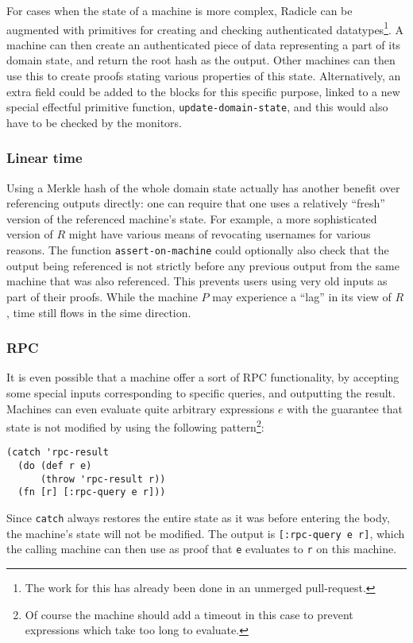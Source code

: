 \documentclass[a4paper, oneside, 10pt]{amsart}
\begin{document}
For cases when the state of a machine is more complex, Radicle can be augmented
with primitives for creating and checking authenticated datatypes\footnote{The
  work for this has already been done in an unmerged pull-request.}. A machine
can then create an authenticated piece of data representing a part of its domain
state, and return the root hash as the output. Other machines can then use this
to create proofs stating various properties of this state. Alternatively, an
extra field could be added to the blocks for this specific purpose, linked to a
new special effectful primitive function, \texttt{update-domain-state}, and this
would also have to be checked by the monitors.

\subsubsection{Linear time}

Using a Merkle hash of the whole domain state actually has another benefit over
referencing outputs directly: one can require that one uses a relatively
``fresh'' version of the referenced machine's state. For example, a more
sophisticated version of $R$ might have various means of revocating usernames
for various reasons. The function \texttt{assert-on-machine} could optionally
also check that the output being referenced is not strictly before any previous
output from the same machine that was also referenced. This prevents users using
very old inputs as part of their proofs. While the machine $P$ may experience a
``lag'' in its view of $R$, time still flows in the sime direction.

\subsubsection{RPC}

It is even possible that a machine offer a sort of RPC functionality, by
accepting some special inputs corresponding to specific queries, and outputting
the result. Machines can even evaluate quite arbitrary expressions $e$ with the
guarantee that state is not modified by using the following pattern\footnote{Of
  course the machine should add a timeout in this case to prevent expressions
  which take too long to evaluate.}:
\begin{verbatim}
(catch 'rpc-result
  (do (def r e)
      (throw 'rpc-result r))
  (fn [r] [:rpc-query e r]))
\end{verbatim}
Since \texttt{catch} always restores the entire state as it was before entering
the body, the machine's state will not be modified. The output is
\texttt{[:rpc-query e r]}, which the calling machine can then use as proof that
\texttt{e} evaluates to \texttt{r} on this machine.
\end{document}
